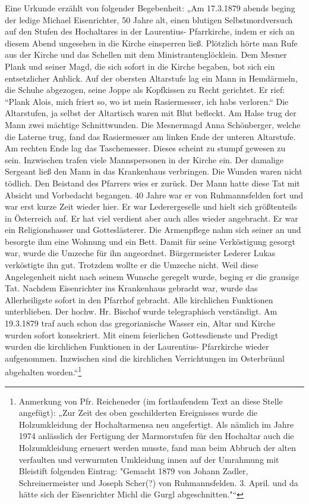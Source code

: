 \documentclass[12pt,a4paper]{book}
\begin{document}
Eine Urkunde erzählt von folgender Begebenheit: „Am 17.3.1879 abends
beging der ledige Michael Eisenrichter, 50 Jahre alt, einen blutigen
Selbstmordversuch auf den Stufen des Hochaltares in der Laurentius-
Pfarrkirche, indem er sich an diesem Abend ungesehen in die Kirche
einsperren ließ. Plötzlich hörte man Rufe aus der Kirche und das
Schellen mit dem Ministrantenglöcklein. Dem Mesner Plank und seiner
Magd, die sich sofort in die Kirche begaben, bot sich ein entsetzlicher
Anblick. Auf der obersten Altarstufe lag ein Mann in Hemdärmeln, die
Schuhe abgezogen, seine Joppe als Kopfkissen zu Recht gerichtet. Er
rief: “Plank Alois, mich friert so, wo ist mein Rasiermesser, ich habs
verloren.“ Die Altarstufen, ja selbst der Altartisch waren mit Blut
befleckt. Am Halse trug der Mann zwei mächtige Schnittwunden. Die
Mesnermagd Anna Schönberger, welche die Laterne trug, fand das
Rasiermesser am linken Ende der unteren Altarstufe. Am rechten Ende lag
das Taschemesser. Dieses scheint zu stumpf gewesen zu sein. Inzwischen
trafen viele Mannspersonen in der Kirche ein. Der damalige Sergeant ließ
den Mann in das Krankenhaus verbringen. Die Wunden waren nicht tödlich.
Den Beistand des Pfarrers wies er zurück. Der Mann hatte diese Tat mit
Absicht und Vorbedacht begangen. 40 Jahre war er von Ruhmannsfelden fort
und war erst kurze Zeit wieder hier. Er war Lederergeselle und hielt
sich größtenteils in Österreich auf. Er hat viel verdient aber auch
alles wieder angebracht. Er war ein Religionshasser und Gotteslästerer.
Die Armenpflege nahm sich seiner an und besorgte ihm eine Wohnung und
ein Bett. Damit für seine Verköstigung gesorgt war, wurde die Umzeche
für ihn angeordnet. Bürgermeister Lederer Lukas verköstigte ihn gut.
Trotzdem wollte er die Umzeche nicht. Weil diese Angelegenheit nicht
nach seinem Wunsche geregelt wurde, beging er die grausige Tat. Nachdem
Eisenrichter ins Krankenhaus gebracht war, wurde das Allerheiligste
sofort in den Pfarrhof gebracht. Alle kirchlichen Funktionen
unterblieben. Der hochw. Hr. Bischof wurde telegraphisch verständigt. Am
19.3.1879 traf auch schon das gregorianische Wasser ein, Altar und
Kirche wurden sofort konsekriert. Mit einem feierlichen Gottesdienste
und Predigt wurden die kirchlichen Funktionen in der Laurentius-
Pfarrkirche wieder aufgenommen. Inzwischen sind die kirchlichen
Verrichtungen im Osterbrünnl abgehalten worden.“\footnote{Anmerkung von
Pfr. Reicheneder (im fortlaufendem Text an diese Stelle angefügt): „Zur
Zeit des oben geschilderten Ereignisses wurde die Holzumkleidung der
Hochaltarmensa neu angefertigt. Als nämlich im Jahre 1974 anlässlich der
Fertigung der Marmorstufen für den Hochaltar auch die Holzumkleidung
erneuert werden musste, fand man beim Abbruch der alten verfaulten und
verwurmten Umkleidung innen auf der Umrahmung mit Bleistift folgenden
Eintrag: "Gemacht 1879 von Johann Zadler, Schreinermeister und Joseph
Scher(?) von Ruhmannsfelden. 3. April. und da hätte sich der
Eisenrichter Michl die Gurgl abgeschnitten."“}
\end{document}
